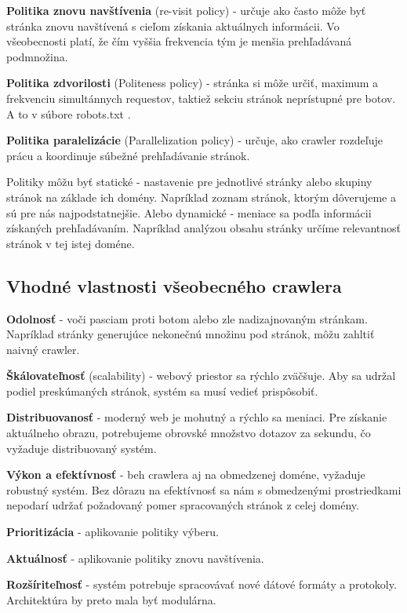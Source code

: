 \textbf{Politika znovu navštívenia} (re-visit policy) - určuje ako často môže byť stránka znovu navštívená s cieľom získania aktuálnych informácii. Vo všeobecnosti platí, že čím vyššia frekvencia tým je menšia prehľadávaná podmnožina. 

\textbf{Politika zdvorilosti} (Politeness policy) - stránka si môže určiť, maximum a frekvenciu simultánnych requestov, taktiež sekciu stránok neprístupné pre botov. A to v súbore robots.txt \cite{robotsTxt}. 

\textbf{Politika paralelizácie} (Parallelization policy) - určuje, ako crawler rozdeľuje prácu a koordinuje súbežné prehľadávanie stránok. 

Politiky môžu byť statické - nastavenie pre jednotlivé stránky alebo skupiny stránok na základe ich domény. Napríklad zoznam stránok, ktorým dôverujeme a sú pre nás najpodstatnejšie. 
Alebo dynamické - meniace sa podľa informácii získaných prehľadávaním. Napríklad analýzou obsahu stránky určíme relevantnosť stránok v tej istej doméne. 


\subsection{Vhodné vlastnosti všeobecného crawlera}

\textbf{Odolnosť} - voči pasciam proti botom alebo zle nadizajnovaným stránkam. Napríklad stránky generujúce nekonečnú množinu pod stránok, môžu zahltiť naivný crawler. 

\textbf{Škálovateľnosť} (scalability) - webový priestor sa rýchlo zväčšuje. Aby sa udržal podiel preskúmaných stránok, systém sa musí 
vedieť prispôsobiť. 

\textbf{Distribuovanosť} -  moderný web je mohutný a rýchlo sa meniaci. Pre získanie aktuálneho obrazu, potrebujeme obrovské množstvo dotazov za sekundu, čo vyžaduje distribuovaný systém. 

\textbf{Výkon a efektívnosť} - beh crawlera aj na obmedzenej doméne, vyžaduje robustný systém. Bez dôrazu na efektívnosť sa nám s obmedzenými prostriedkami nepodarí udržať požadovaný pomer spracovaných stránok z celej domény.

\textbf{Prioritizácia} - aplikovanie politiky výberu.

\textbf{Aktuálnosť} - aplikovanie politiky znovu navštívenia.

\textbf{Rozšíriteľnosť} - systém potrebuje spracovávať nové dátové formáty a protokoly. Architektúra by preto mala byť modulárna. 

